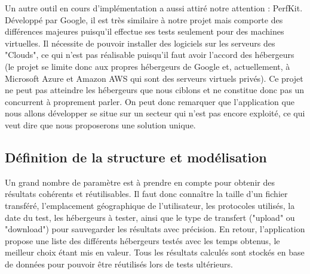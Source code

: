 \documentclass[10pt]{article}
\begin{document}
Un autre outil en cours d'implémentation a aussi attiré notre
attention : PerfKit. Développé par Google, il est très similaire à
notre projet mais comporte des différences majeures puisqu'il effectue
ses tests seulement pour des machines virtuelles. Il nécessite de
pouvoir installer des logiciels sur les serveurs des "Clouds", ce qui
n'est pas réalisable puisqu'il faut avoir l'accord des hébergeurs (le
projet se limite donc aux propres hébergeurs de Google et,
actuellement, à Microsoft Azure et Amazon AWS qui sont des serveurs
virtuels privés). Ce projet ne peut pas atteindre les hébergeurs que
nous ciblons et ne constitue donc pas un concurrent à proprement
parler. On peut donc remarquer que l’application que nous allons
développer se situe sur un secteur qui n’est pas encore exploité, ce
qui veut dire que nous proposerons une solution unique.

\subsection{Définition de la structure et modélisation}

Un grand nombre de paramètre est à prendre en compte pour obtenir des
résultats cohérents et réutilisables. Il faut donc connaître la taille
d'un fichier transféré, l'emplacement géographique de l'utilisateur, les
protocoles utilisés, la date du test, les hébergeurs à tester, ainsi
que le type de transfert ("upload" ou "download") pour sauvegarder les
résultats avec précision. En retour, l'application propose une liste
des différents hébergeurs testés avec les temps obtenus, le meilleur
choix étant mis en valeur. Tous les résultats calculés sont stockés en
base de données pour pouvoir être réutilisés lors de tests ultérieurs.
  
\end{document}
